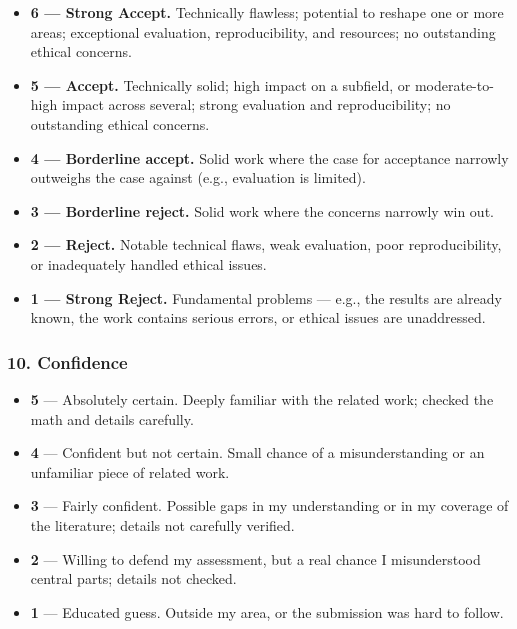 \begin{itemize}
  \item[{$[\;\;\;]$}] \textbf{6 --- Strong Accept.} Technically flawless; potential
  to reshape one or more areas; exceptional evaluation, reproducibility, and
  resources; no outstanding ethical concerns.
  \item[{$[\;\;\;]$}] \textbf{5 --- Accept.} Technically solid; high impact on a
  subfield, or moderate-to-high impact across several; strong evaluation and
  reproducibility; no outstanding ethical concerns.
  \item[{$[\;\;\;]$}] \textbf{4 --- Borderline accept.} Solid work where the case
  for acceptance narrowly outweighs the case against (e.g., evaluation is
  limited).
  \item[{$[\;\;\;]$}] \textbf{3 --- Borderline reject.} Solid work where the
  concerns narrowly win out.
  \item[{$[\times]$}] \textbf{2 --- Reject.} Notable technical flaws, weak
  evaluation, poor reproducibility, or inadequately handled ethical issues.
  \item[{$[\;\;\;]$}] \textbf{1 --- Strong Reject.} Fundamental problems ---
  e.g., the results are already known, the work contains serious errors, or
  ethical issues are unaddressed.
\end{itemize}

\subsubsection*{10. Confidence}

\begin{itemize}
  \item[{$[\;\;\;]$}] \textbf{5} --- Absolutely certain. Deeply familiar with
  the related work; checked the math and details carefully.
  \item[{$[\times]$}] \textbf{4} --- Confident but not certain. Small chance of
  a misunderstanding or an unfamiliar piece of related work.
  \item[{$[\;\;\;]$}] \textbf{3} --- Fairly confident. Possible gaps in my
  understanding or in my coverage of the literature; details not carefully
  verified.
  \item[{$[\;\;\;]$}] \textbf{2} --- Willing to defend my assessment, but a real
  chance I misunderstood central parts; details not checked.
  \item[{$[\;\;\;]$}] \textbf{1} --- Educated guess. Outside my area, or the
  submission was hard to follow.
\end{itemize}

